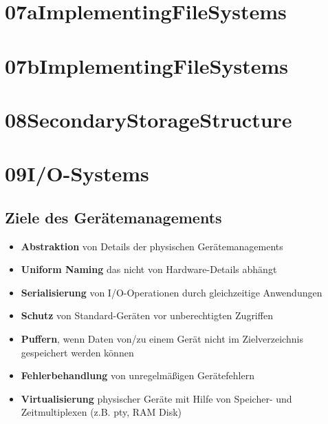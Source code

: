 \documentclass[a4paper]{scrreprt}
\begin{document}
\chapter{07aImplementingFileSystems}
\chapter{07bImplementingFileSystems}
\chapter{08SecondaryStorageStructure}
\chapter{09I/O-Systems}

\section{Ziele des Gerätemanagements}
\begin{itemize}
	\item \textbf{Abstraktion} von Details der physischen Gerätemanagements
	\item \textbf{Uniform Naming} das nicht von Hardware-Details abhängt
	\item \textbf{Serialisierung} von I/O-Operationen durch gleichzeitige Anwendungen
	\item \textbf{Schutz} von Standard-Geräten vor unberechtigten Zugriffen 
	\item \textbf{Puffern}, wenn Daten von/zu einem Gerät nicht im Zielverzeichnis gespeichert werden können 
	\item \textbf{Fehlerbehandlung} von unregelmäßigen Gerätefehlern
	\item \textbf{Virtualisierung} physischer Geräte mit Hilfe von Speicher- und Zeitmultiplexen (z.B. pty, RAM Disk)
\end{itemize}
\end{document}
